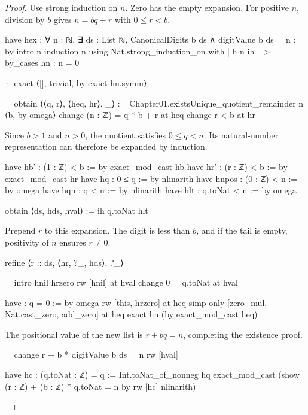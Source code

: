 \begin{proof}
  Use strong induction on $n$.
  Zero has the empty expansion.
  For positive $n$, division by $b$ gives $n=bq+r$ with $0\le r<b$.

  \begin{lean}
    have hex : ∀ n : ℕ, ∃ ds : List ℕ, CanonicalDigits b ds ∧ digitValue b ds = n := by
      intro n
      induction n using Nat.strong_induction_on with
      | h n ih =>
        by_cases hn : n = 0

        · exact ⟨[], trivial, by exact hn.symm⟩

        · obtain ⟨⟨q, r⟩, ⟨heq, hr⟩, _⟩ :=
            Chapter01.existsUnique_quotient_remainder n ⟨b, by omega⟩
          change (n : ℤ) = q * b + r at heq
          change r < b at hr
  \end{lean}

  Since $b>1$ and $n>0$, the quotient satisfies $0\le q<n$.
  Its natural-number representation can therefore be expanded by induction.

  \begin{lean}
    have hb' : (1 : ℤ) < b := by
      exact_mod_cast hb
    have hr' : (r : ℤ) < b := by
      exact_mod_cast hr
    have hq : 0 ≤ q := by
      nlinarith
    have hnpos : (0 : ℤ) < n := by
      omega
    have hqn : q < n := by
      nlinarith
    have hlt : q.toNat < n := by
      omega

    obtain ⟨ds, hds, hval⟩ := ih q.toNat hlt
  \end{lean}

  Prepend $r$ to this expansion.
  The digit is less than $b$, and if the tail is empty, positivity of $n$ ensures $r\ne0$.

  \begin{lean}
    refine ⟨r :: ds, ⟨hr, ?_, hds⟩, ?_⟩

    · intro hnil hrzero
      rw [hnil] at hval
      change 0 = q.toNat at hval

      have : q = 0 := by
        omega
      rw [this, hrzero] at heq
      simp only [zero_mul, Nat.cast_zero, add_zero] at heq
      exact hn (by exact_mod_cast heq)
  \end{lean}

  The positional value of the new list is $r+bq=n$, completing the existence proof.

  \begin{lean}
    · change r + b * digitValue b ds = n
      rw [hval]

      have hc : (q.toNat : ℤ) = q := Int.toNat_of_nonneg hq
      exact_mod_cast (show (r : ℤ) + (b : ℤ) * q.toNat = n by
          rw [hc]
          nlinarith)
  \end{lean}


\end{proof}
